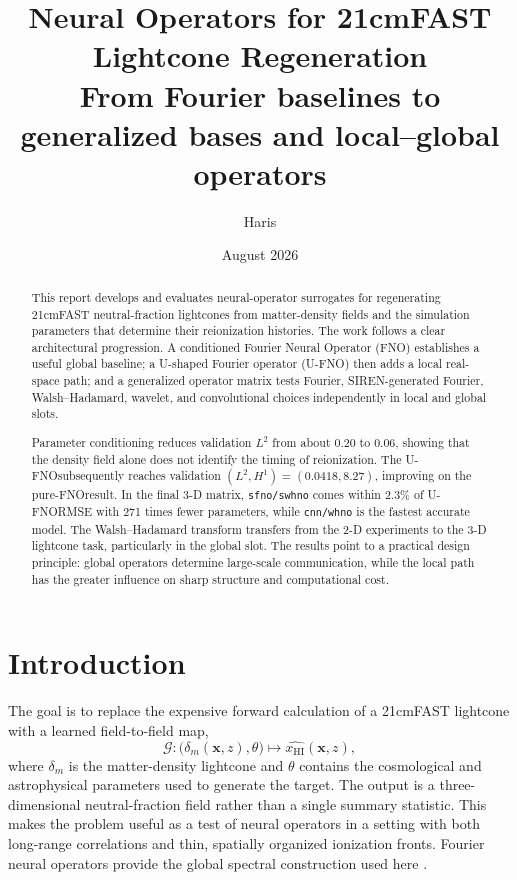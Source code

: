\documentclass[11pt,a4paper]{article}
\title{\textbf{Neural Operators for 21cmFAST Lightcone Regeneration}\\
\large From Fourier baselines to generalized bases and local--global operators}
\author{Haris}
\date{August 2026}
\newcommand{\xhi}{x_{\mathrm{HI}}}
\newcommand{\Ltwo}{L^2}
\newcommand{\Hone}{H^1}
\newcommand{\FNO}{\textsc{FNO}}
\newcommand{\UFNO}{\textsc{U-FNO}}
\newcommand{\code}[1]{\texttt{#1}}
\begin{document}
\maketitle
\thispagestyle{empty}

\begin{abstract}
This report develops and evaluates neural-operator surrogates for regenerating
21cmFAST neutral-fraction lightcones from matter-density fields and the
simulation parameters that determine their reionization histories. The work
follows a clear architectural progression. A conditioned Fourier Neural
Operator (\FNO) establishes a useful global baseline; a U-shaped Fourier
operator (\UFNO) then adds a local real-space path; and a generalized operator
matrix tests Fourier, SIREN-generated Fourier, Walsh--Hadamard, wavelet, and
convolutional choices independently in local and global slots.

Parameter conditioning reduces validation \(\Ltwo\) from about \(0.20\) to
\(0.06\), showing that the density field alone does not identify the timing of
reionization. The \UFNO subsequently reaches validation
\((\Ltwo,\Hone)=(0.0418,8.27)\), improving on the pure-\FNO result. In the
final 3-D matrix, \code{sfno/swhno} comes within \(2.3\%\) of \UFNO RMSE with
271 times fewer parameters, while \code{cnn/whno} is the fastest accurate
model. The Walsh--Hadamard transform transfers from the 2-D experiments to
the 3-D lightcone task, particularly in the global slot. The results point to
a practical design principle: global operators determine large-scale
communication, while the local path has the greater influence on sharp
structure and computational cost.
\end{abstract}

\tableofcontents
\clearpage

\section{Introduction}

The goal is to replace the expensive forward calculation of a 21cmFAST
lightcone with a learned field-to-field map,
\begin{equation}
  \mathcal{G}:\bigl(\delta_m(\mathbf{x},z),\theta\bigr)
  \longmapsto \widehat{\xhi}(\mathbf{x},z),
  \label{eq:map}
\end{equation}
where \(\delta_m\) is the matter-density lightcone and \(\theta\) contains the
cosmological and astrophysical parameters used to generate the target. The
output is a three-dimensional neutral-fraction field rather than a single
summary statistic. This makes the problem useful as a test of neural operators
in a setting with both long-range correlations and thin, spatially organized
ionization fronts. Fourier neural operators provide the global spectral
construction used here \cite{li2021fno}.
\end{document}
